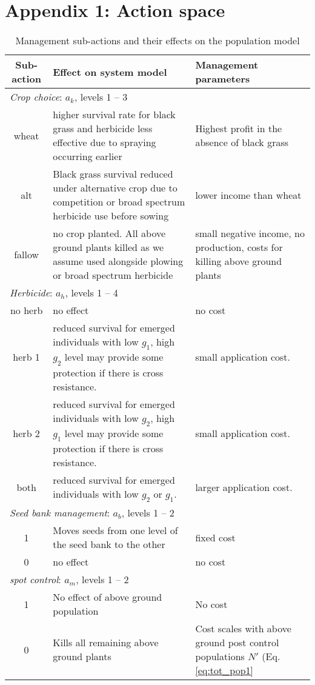 \documentclass[12pt, a4paper]{article}
\begin{document}
\newpage
\section*{Appendix 1: Action space}
\begin{longtable}[h]{c p{9cm} p{4cm}}
\caption{Management sub-actions and their effects on the population model\label{table:actions}}\\
	\hline
	\textbf{Sub-action} & \textbf{Effect on system model} & \textbf{Management parameters}\\
	\hline	
	\multicolumn{3}{l}{\textit{Crop choice}: $a_k$, levels 1 -- 3}\\
	wheat & higher survival rate for black grass and herbicide less effective due to spraying occurring earlier & Highest profit in the absence of black grass \\
	alt & Black grass survival reduced under alternative crop due to competition or broad spectrum herbicide use before sowing & lower income than wheat\\
	fallow & no crop planted. All above ground plants killed as we assume used alongside plowing or broad spectrum herbicide & small negative income, no production, costs for killing above ground plants\\
	\multicolumn{3}{l}{\textit{Herbicide}: $a_h$, levels 1 -- 4}\\
	no herb & no effect & no cost\\ 
	herb 1 & reduced survival for emerged individuals with low $g_1$, high $g_2$ level may provide some protection if there is cross resistance. & small application cost.\\
	herb 2 & reduced survival for emerged individuals with low $g_2$, high $g_1$ level may provide some protection if there is cross resistance. & small application cost.\\  
	both & reduced survival for emerged individuals with low $g_2$ or $g_1$. & larger application cost.\\  
	\multicolumn{3}{l}{\textit{Seed bank management}: $a_b$, levels 1 -- 2}\\
	1 & Moves seeds from one level of the seed bank to the other & fixed cost\\
	0 & no effect & no cost\\
	\multicolumn{3}{l}{\textit{spot control}: $a_m$, levels 1 -- 2}\\
	1 & No effect of above ground population & No cost\\
	0 & Kills all remaining above ground plants & Cost scales with above ground post control populations $N'$ (Eq. \ref{eq:tot_pop1} \\
	\hline
\end{longtable}
\end{document}
